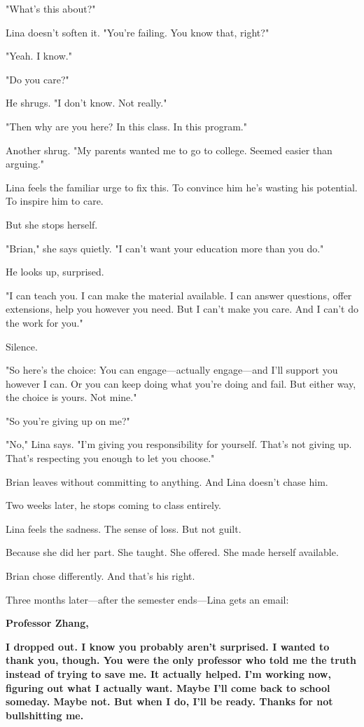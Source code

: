 \documentclass[11pt,twoside]{book}
\begin{document}
"What's this about?"

Lina doesn't soften it. "You're failing. You know that, right?"

"Yeah. I know."

"Do you care?"

He shrugs. "I don't know. Not really."

"Then why are you here? In this class. In this program."

Another shrug. "My parents wanted me to go to college. Seemed easier than arguing."

Lina feels the familiar urge to fix this. To convince him he's wasting his potential. To inspire him to care.

But she stops herself.

"Brian," she says quietly. "I can't want your education more than you do."

He looks up, surprised.

"I can teach you. I can make the material available. I can answer questions, offer extensions, help you however you need. But I can't make you care. And I can't do the work for you."

Silence.

"So here's the choice: You can engage—actually engage—and I'll support you however I can. Or you can keep doing what you're doing and fail. But either way, the choice is yours. Not mine."

"So you're giving up on me?"

"No," Lina says. "I'm giving you responsibility for yourself. That's not giving up. That's respecting you enough to let you choose."

Brian leaves without committing to anything. And Lina doesn't chase him.

Two weeks later, he stops coming to class entirely.

Lina feels the sadness. The sense of loss. But not guilt.

Because she did her part. She taught. She offered. She made herself available.

Brian chose differently. And that's his right.

Three months later—after the semester ends—Lina gets an email:

\textbf{Professor Zhang,}

\textbf{I dropped out. I know you probably aren't surprised. I wanted to thank you, though. You were the only professor who told me the truth instead of trying to save me. It actually helped. I'm working now, figuring out what I actually want. Maybe I'll come back to school someday. Maybe not. But when I do, I'll be ready. Thanks for not bullshitting me.}
\end{document}
